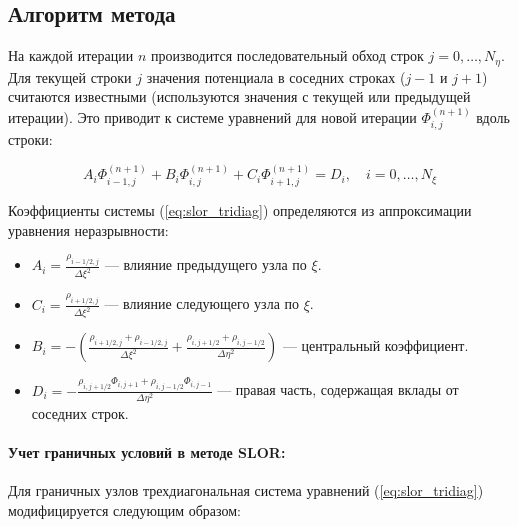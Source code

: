 \documentclass[a4paper,12pt]{article}
\begin{document}
	\subsection{Алгоритм метода}
	
	На каждой итерации $n$ производится последовательный обход строк $j = 0, \dots, N_\eta$. Для текущей строки $j$ значения потенциала в соседних строках ($j-1$ и $j+1$) считаются известными (используются значения с текущей или предыдущей итерации). Это приводит к системе уравнений для новой итерации $\Phi_{i,j}^{(n+1)}$ вдоль строки:
	
	\begin{equation}
		A_i \Phi_{i-1,j}^{(n+1)} + B_i \Phi_{i,j}^{(n+1)} + C_i \Phi_{i+1,j}^{(n+1)} = D_i, \quad i = 0, \dots, N_\xi
		\label{eq:slor_tridiag}
	\end{equation}
	
	Коэффициенты системы (\ref{eq:slor_tridiag}) определяются из аппроксимации уравнения неразрывности:
	
	\begin{itemize}
		\item $A_i = \displaystyle \frac{\rho_{i-1/2,j}}{\Delta \xi^2}$ — влияние предыдущего узла по $\xi$.
		\item $C_i = \displaystyle \frac{\rho_{i+1/2,j}}{\Delta \xi^2}$ — влияние следующего узла по $\xi$.
		\item $B_i = \displaystyle -\left( \frac{\rho_{i+1/2,j} + \rho_{i-1/2,j}}{\Delta \xi^2} + \frac{\rho_{i,j+1/2} + \rho_{i,j-1/2}}{\Delta \eta^2} \right)$ — центральный коэффициент.
		\item $D_i = \displaystyle - \frac{\rho_{i,j+1/2} \Phi_{i,j+1} + \rho_{i,j-1/2} \Phi_{i,j-1}}{\Delta \eta^2}$ — правая часть, содержащая вклады от соседних строк.
	\end{itemize}

	\paragraph{Учет граничных условий в методе SLOR:}
	
	Для граничных узлов трехдиагональная система уравнений (\ref{eq:slor_tridiag}) модифицируется следующим образом:
	
\end{document}

